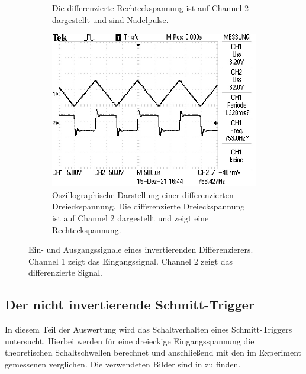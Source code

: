 \begin{figure}
\begin{subfigure}[b]{0.45\textwidth}
{        Die differenzierte Rechteckspannung ist auf Channel 2 dargestellt und sind Nadelpulse.}
        \label{fig:diff_recht}
    \end{subfigure}
    \newline
    \newline  
    \newline
    \newline  
    \newline  
    \begin{subfigure}{0.45\textwidth}
        \centering
        \includegraphics[width=\textwidth]{data_of_others_cuz_ours_suck/diff/diff dreieck.JPG}
        \caption{Oszillographische Darstellung einer differenzierten Dreieckspannung.
        Die differenzierte Dreieckspannung ist auf Channel 2 dargestellt und zeigt eine Rechteckspannung.}
        \label{fig:diff_drei}
    \end{subfigure}
       \caption{Ein- und Ausgangssignale eines invertierenden Differenzierers. Channel 1 zeigt
       das Eingangssignal. Channel 2 zeigt das differenzierte Signal.}
       \label{fig:diff}
\end{figure}
\FloatBarrier

\subsection{Der nicht invertierende Schmitt-Trigger \cite{schmitt}}
In diesem Teil der Auswertung wird das Schaltverhalten eines Schmitt-Triggers untersucht.
Hierbei werden für eine dreieckige Eingangsspannung die theoretischen Schaltschwellen berechnet und 
anschließend mit den im Experiment gemessenen verglichen.
Die verwendeten Bilder sind in \cite{schmitt} zu finden.

